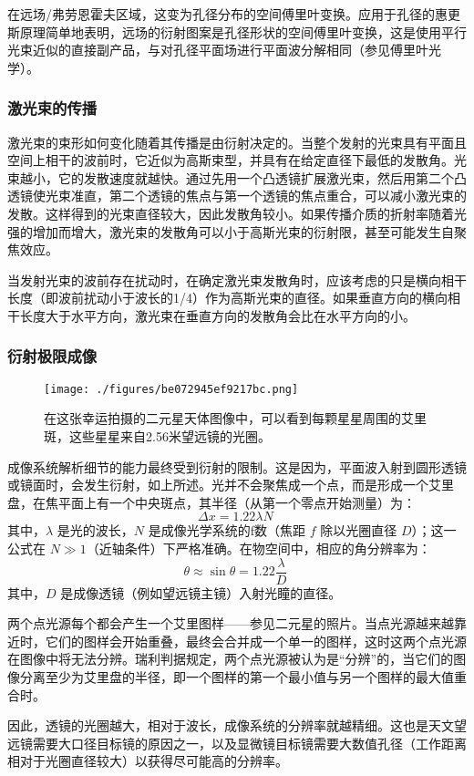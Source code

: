 在远场/弗劳恩霍夫区域，这变为孔径分布的空间傅里叶变换。应用于孔径的惠更斯原理简单地表明，远场的衍射图案是孔径形状的空间傅里叶变换，这是使用平行光束近似的直接副产品，与对孔径平面场进行平面波分解相同（参见傅里叶光学）。
\subsubsection{激光束的传播}
激光束的束形如何变化随着其传播是由衍射决定的。当整个发射的光束具有平面且空间上相干的波前时，它近似为高斯束型，并具有在给定直径下最低的发散角。光束越小，它的发散速度就越快。通过先用一个凸透镜扩展激光束，然后用第二个凸透镜使光束准直，第二个透镜的焦点与第一个透镜的焦点重合，可以减小激光束的发散。这样得到的光束直径较大，因此发散角较小。如果传播介质的折射率随着光强的增加而增大，激光束的发散角可以小于高斯光束的衍射限，甚至可能发生自聚焦效应。

当发射光束的波前存在扰动时，在确定激光束发散角时，应该考虑的只是横向相干长度（即波前扰动小于波长的1/4）作为高斯光束的直径。如果垂直方向的横向相干长度大于水平方向，激光束在垂直方向的发散角会比在水平方向的小。
\subsubsection{衍射极限成像}
\begin{figure}[ht]
\centering
\texttt{[image: ./figures/be072945ef9217bc.png]}
\caption{在这张幸运拍摄的二元星天体图像中，可以看到每颗星星周围的艾里斑，这些星星来自2.56米望远镜的光圈。} \label{fig_YS_22}
\end{figure}
成像系统解析细节的能力最终受到衍射的限制。这是因为，平面波入射到圆形透镜或镜面时，会发生衍射，如上所述。光并不会聚焦成一个点，而是形成一个艾里盘，在焦平面上有一个中央斑点，其半径（从第一个零点开始测量）为：
\[
\Delta x = 1.22 \lambda N~
\]
其中，\(\lambda\) 是光的波长，\(N\) 是成像光学系统的f数（焦距 \(f\) 除以光圈直径 \(D\)）；这一公式在 \(N \gg 1\)（近轴条件）下严格准确。在物空间中，相应的角分辨率为：
\[
\theta \approx \sin \theta = 1.22 \frac{\lambda}{D}~
\]
其中，\(D\) 是成像透镜（例如望远镜主镜）入射光瞳的直径。

两个点光源每个都会产生一个艾里图样——参见二元星的照片。当点光源越来越靠近时，它们的图样会开始重叠，最终会合并成一个单一的图样，这时这两个点光源在图像中将无法分辨。瑞利判据规定，两个点光源被认为是“分辨”的，当它们的图像分离至少为艾里盘的半径，即一个图样的第一个最小值与另一个图样的最大值重合时。

因此，透镜的光圈越大，相对于波长，成像系统的分辨率就越精细。这也是天文望远镜需要大口径目标镜的原因之一，以及显微镜目标镜需要大数值孔径（工作距离相对于光圈直径较大）以获得尽可能高的分辨率。
